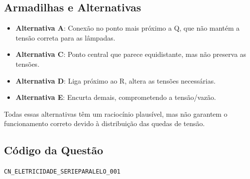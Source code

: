 \documentclass{article}
\begin{document}
\subsection*{Armadilhas e Alternativas}

\begin{itemize}
  \item \textbf{Alternativa A}: Conexão no ponto mais próximo a Q, que não mantém a tensão correta para as lâmpadas.
  \item \textbf{Alternativa C}: Ponto central que parece equidistante, mas não preserva as tensões.
  \item \textbf{Alternativa D}: Liga próximo ao R, altera as tensões necessárias.
  \item \textbf{Alternativa E}: Encurta demais, comprometendo a tensão/vazão.
\end{itemize}

Todas essas alternativas têm um raciocínio plausível, mas não garantem o funcionamento correto devido à distribuição das quedas de tensão.

\subsection*{Código da Questão}
\texttt{CN\_ELETRICIDADE\_SERIEPARALELO\_001}

\vspace{0.5cm}

\end{document}
